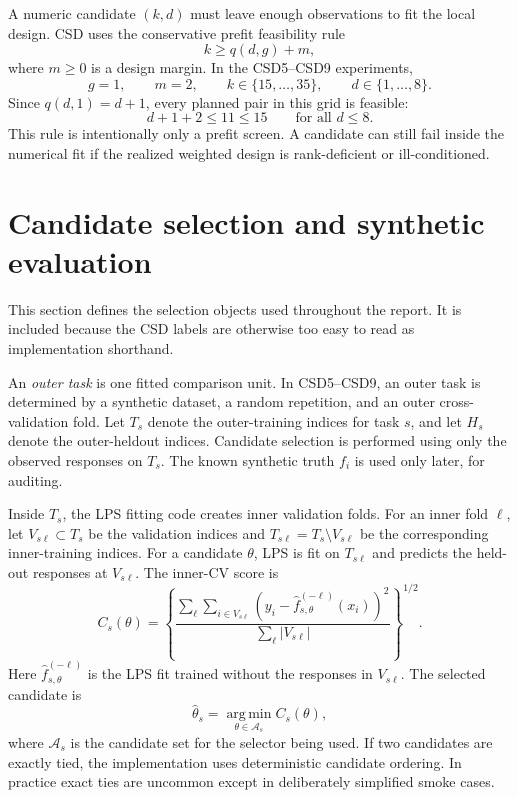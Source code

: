 \documentclass[11pt]{article}
\newcommand{\argmin}{\operatorname*{arg\,min}}
\begin{document}
A numeric candidate $(k,d)$ must leave enough observations to fit the local
design.  CSD uses the conservative prefit feasibility rule
\[
  k \ge q(d,g)+m,
\]
where $m\ge 0$ is a design margin.  In the CSD5--CSD9 experiments,
\[
  g=1,\qquad m=2,\qquad k\in\{15,\ldots,35\},\qquad d\in\{1,\ldots,8\}.
\]
Since $q(d,1)=d+1$, every planned pair in this grid is feasible:
\[
  d+1+2\le 11 \le 15
  \qquad\text{for all } d\le 8.
\]
This rule is intentionally only a prefit screen.  A candidate can still fail
inside the numerical fit if the realized weighted design is rank-deficient or
ill-conditioned.

\section{Candidate selection and synthetic evaluation}

This section defines the selection objects used throughout the report.  It is
included because the CSD labels are otherwise too easy to read as implementation
shorthand.

An \emph{outer task} is one fitted comparison unit.  In CSD5--CSD9, an outer
task is determined by a synthetic dataset, a random repetition, and an outer
cross-validation fold.  Let $T_s$ denote the outer-training indices for task
$s$, and let $H_s$ denote the outer-heldout indices.  Candidate selection is
performed using only the observed responses on $T_s$.  The known synthetic truth
$f_i$ is used only later, for auditing.

Inside $T_s$, the LPS fitting code creates inner validation folds.  For an inner
fold $\ell$, let $V_{s\ell}\subset T_s$ be the validation indices and
$T_{s\ell}=T_s\setminus V_{s\ell}$ be the corresponding inner-training indices.
For a candidate $\theta$, LPS is fit on $T_{s\ell}$ and predicts the held-out
responses at $V_{s\ell}$.  The inner-CV score is
\[
  C_s(\theta)
  =
  \left\{
  \frac{\sum_{\ell}\sum_{i\in V_{s\ell}}
  \left(y_i-\widehat f^{(-\ell)}_{s,\theta}(x_i)\right)^2}
  {\sum_{\ell}|V_{s\ell}|}
  \right\}^{1/2}.
\]
Here $\widehat f^{(-\ell)}_{s,\theta}$ is the LPS fit trained without the
responses in $V_{s\ell}$.  The selected candidate is
\[
  \widehat\theta_s
  =
  \argmin_{\theta\in\mathcal A_s} C_s(\theta),
\]
where $\mathcal A_s$ is the candidate set for the selector being used.  If two
candidates are exactly tied, the implementation uses deterministic candidate
ordering.  In practice exact ties are uncommon except in deliberately simplified
smoke cases.
\end{document}
